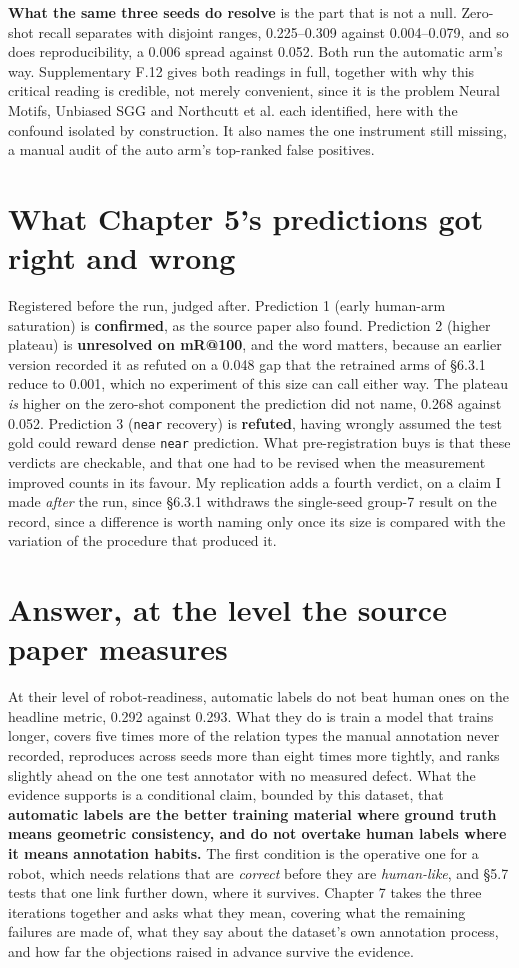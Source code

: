\textbf{What the same three seeds do resolve} is the part that is not a null. Zero-shot recall separates with disjoint ranges, 0.225--0.309 against 0.004--0.079, and so does reproducibility, a 0.006 spread against 0.052. Both run the automatic arm's way. Supplementary F.12 gives both readings in full, together with why this critical reading is credible, not merely convenient, since it is the problem Neural Motifs, Unbiased SGG and Northcutt et al. each identified, here with the confound isolated by construction. It also names the one instrument still missing, a manual audit of the auto arm's top-ranked false positives.

\section{What Chapter 5's predictions got right and wrong}

Registered before the run, judged after. Prediction 1 (early human-arm saturation) is \textbf{confirmed}, as the source paper also found. Prediction 2 (higher plateau) is \textbf{unresolved on mR@100}, and the word matters, because an earlier version recorded it as refuted on a 0.048 gap that the retrained arms of \S{}6.3.1 reduce to 0.001, which no experiment of this size can call either way. The plateau \textit{is} higher on the zero-shot component the prediction did not name, 0.268 against 0.052. Prediction 3 (\texttt{near} recovery) is \textbf{refuted}, having wrongly assumed the test gold could reward dense \texttt{near} prediction. What pre-registration buys is that these verdicts are checkable, and that one had to be revised when the measurement improved counts in its favour. My replication adds a fourth verdict, on a claim I made \textit{after} the run, since \S{}6.3.1 withdraws the single-seed group-7 result on the record, since a difference is worth naming only once its size is compared with the variation of the procedure that produced it.

\section{Answer, at the level the source paper measures}

At their level of robot-readiness, automatic labels do not beat human ones on the headline metric, 0.292 against 0.293. What they do is train a model that trains longer, covers five times more of the relation types the manual annotation never recorded, reproduces across seeds more than eight times more tightly, and ranks slightly ahead on the one test annotator with no measured defect. What the evidence supports is a conditional claim, bounded by this dataset, that \textbf{automatic labels are the better training material where ground truth means geometric consistency, and do not overtake human labels where it means annotation habits.} The first condition is the operative one for a robot, which needs relations that are \textit{correct} before they are \textit{human-like}, and \S{}5.7 tests that one link further down, where it survives. Chapter 7 takes the three iterations together and asks what they mean, covering what the remaining failures are made of, what they say about the dataset's own annotation process, and how far the objections raised in advance survive the evidence.